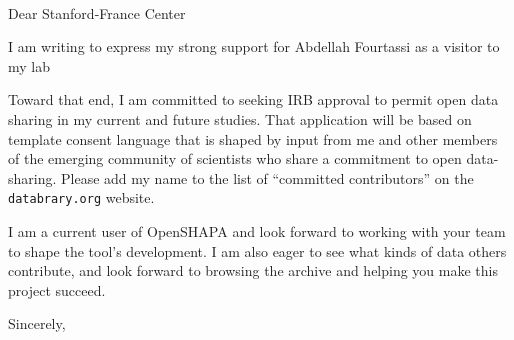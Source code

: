 \documentclass[12pt]{letter}
\begin{document}
\begin{letter}{~~}

\opening{Dear Stanford-France Center}

I am writing to express my strong support for Abdellah Fourtassi as a visitor to my lab

Toward that end, I am committed to seeking IRB approval to permit open data sharing in my current and future studies. That application will be based on template consent language that is shaped by input from me and other members of the emerging community of scientists who share a commitment to open data-sharing. Please add my name to the list of ``committed contributors'' on the \texttt{databrary.org} website.

I am a current user of OpenSHAPA and look forward to working with your team to shape the tool's development. I am also eager to see what kinds of data others contribute, and look forward to browsing the archive and helping you make this project succeed.

\closing{Sincerely,}

\end{letter}
\end{document}
